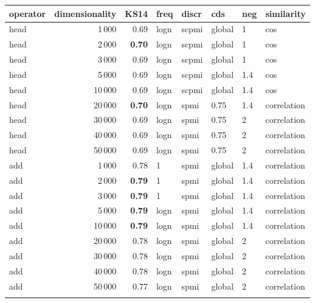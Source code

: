 \begin{tabular}{lrrlllll}
\toprule
operator &  dimensionality &  KS14 &  freq &  discr &     cds &  neg &     similarity \\
\midrule
    head &            1\,000 &  0.69 &  logn &  scpmi &  global &    1 &            cos \\
    head &            2\,000 &  \textbf{0.70} &  logn &  scpmi &  global &    1 &            cos \\
    head &            3\,000 &  0.69 &  logn &  scpmi &  global &    1 &            cos \\
    head &            5\,000 &  0.69 &  logn &  scpmi &  global &  1.4 &            cos \\
    head &           10\,000 &  0.69 &  logn &  scpmi &  global &  1.4 &            cos \\
    head &           20\,000 &  \textbf{0.70} &  logn &   spmi &    0.75 &  1.4 &    correlation \\
    head &           30\,000 &  0.69 &  logn &   spmi &    0.75 &    2 &    correlation \\
    head &           40\,000 &  0.69 &  logn &   spmi &    0.75 &    2 &    correlation \\
    head &           50\,000 &  0.69 &  logn &   spmi &    0.75 &    2 &    correlation \\ \addlinespace
     add &            1\,000 &  0.78 &     1 &   spmi &  global &  1.4 &    correlation \\
     add &            2\,000 &  \textbf{0.79} &     1 &   spmi &  global &  1.4 &    correlation \\
     add &            3\,000 &  \textbf{0.79} &     1 &   spmi &  global &  1.4 &    correlation \\
     add &            5\,000 &  \textbf{0.79} &  logn &   spmi &  global &  1.4 &    correlation \\
     add &           10\,000 &  \textbf{0.79} &  logn &   spmi &  global &  1.4 &    correlation \\
     add &           20\,000 &  0.78 &  logn &   spmi &  global &    2 &    correlation \\
     add &           30\,000 &  0.78 &  logn &   spmi &  global &    2 &    correlation \\
     add &           40\,000 &  0.78 &  logn &   spmi &  global &    2 &    correlation \\
     add &           50\,000 &  0.77 &  logn &   spmi &  global &    2 &    correlation \\ \addlinespace

\end{tabular}
